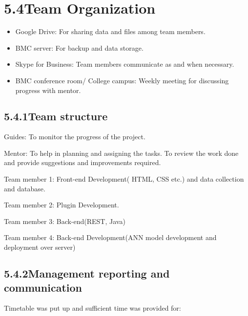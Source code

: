 \documentclass[oneside,a4paper,12pt]{book}
\begin{document}
\section*{5.4\hspace*{10pt}Team Organization}
\setlength{\parskip}{0.0pt}
\begin{itemize}
	\item Google Drive: For sharing data and files among team members.\par

	\item BMC server: For backup and data storage.\par

	\item Skype for Business: Team members communicate as and when necessary.\par

	\item BMC conference room/ College campus: Weekly meeting for discussing progress with mentor.
\end{itemize}\par
\setlength{\parskip}{9.96pt}
\subsection*{5.4.1\hspace*{10pt}Team structure}
\tab  Guides: To monitor the progress of the project.\par

\tab Mentor: To help in planning and assigning the tasks. To review the work done and provide suggestions and improvements required.\par

Team member 1: Front-end Development( HTML, CSS etc.) and data collection and database.\par

Team member 2: Plugin Development.\par

Team member 3: Back-end(REST, Java)\par

Team member 4: Back-end Development(ANN model development and deployment over server)\par

\subsection*{5.4.2\hspace*{10pt}Management reporting and communication}
Timetable was put up and sufficient time was provided for:\par
\end{document}
